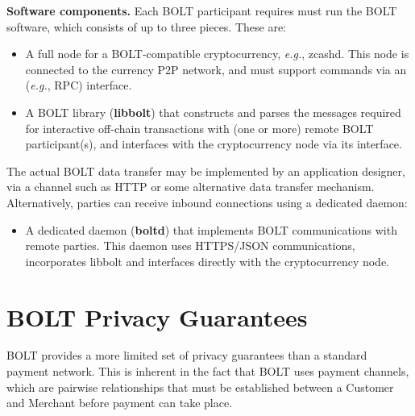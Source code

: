 \documentclass[10pt]{report}
\begin{document}
\noindent
{\bf Software components.} Each BOLT participant requires must run the BOLT software, which consists of up to three pieces. These are:

\begin{itemize}
\item A full node for a BOLT-compatible cryptocurrency, {\em e.g.}, zcashd. This node is connected to the currency P2P network, and must support commands via an ({\em e.g.}, RPC) interface.
\item A BOLT library ({\bf libbolt}) that constructs and parses the messages required for interactive off-chain transactions with (one or more) remote BOLT participant(s), and interfaces with the cryptocurrency node via its interface.
\end{itemize}

The actual BOLT data transfer may be implemented by an application designer, via a channel such as HTTP or some alternative data transfer mechanism. Alternatively, parties can receive inbound connections using a dedicated daemon:

\begin{itemize}
\item A dedicated daemon ({\bf boltd}) that implements BOLT communications with remote parties. This daemon uses HTTPS/JSON communications, incorporates libbolt and interfaces directly with the cryptocurrency node.
\end{itemize}

\section{BOLT Privacy Guarantees}
\label{sec:privacy}

BOLT provides a more limited set of privacy guarantees than a standard payment network. This is inherent in the fact that BOLT uses payment channels, which are pairwise relationships that must be established between a Customer and Merchant before payment can take place.
\end{document}

